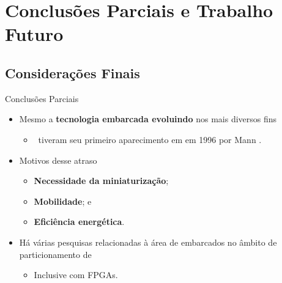 \section{Conclusões Parciais e Trabalho Futuro}
   \subsection{Considerações Finais}
   \begin{frame}{Conclusões Parciais} \vspace{-1em}
      \begin{itemize} \setlength{\itemsep}{1.4em}
         \item 
         Mesmo a \textbf{tecnologia embarcada evoluindo} nos mais diversos fins
         \begin{itemize}
            \item \Wearables\ tiveram seu primeiro aparecimento em em 1996 por Mann \cite{Mann1996}.
         \end{itemize}
      
         \item Motivos desse atraso
         \begin{itemize} \setlength{\itemsep}{0.4em}
            \item \textbf{Necessidade da miniaturização};
            \item \textbf{Mobilidade}; e
            \item \textbf{Eficiência energética}.
         \end{itemize}
         
         \item Há várias pesquisas relacionadas à área de embarcados no âmbito de particionamento de \hs
         \begin{itemize}
            \item Inclusive com FPGAs.
         \end{itemize}
         
      \end{itemize}
   \end{frame}

